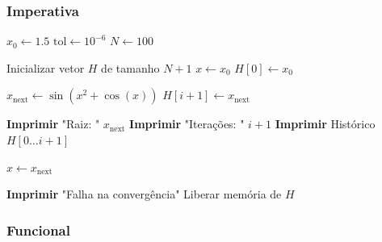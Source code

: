 \subsubsection{Imperativa}

\begin{algorithm}[H]
    \caption{Método do Ponto Fixo Iterativo}
    \label{alg:pontofixo_imperativo}
    \begin{algorithmic}[1]
            \State $x_0 \gets 1.5$ 
            \State $\text{tol} \gets 10^{-6}$ 
            \State $N \gets 100$ 
            
            \State Inicializar vetor $H$ de tamanho $N+1$ 
            \State $x \gets x_0$
            \State $H[0] \gets x_0$
            
                \State $x_{\text{next}} \gets \sin(x^2 + \cos(x))$ 
                \State $H[i+1] \gets x_{\text{next}}$ 
                
                    \State \textbf{Imprimir} "Raiz: " $x_{\text{next}}$
                    \State \textbf{Imprimir} "Iterações: " $i+1$
                    \State \textbf{Imprimir} Histórico $H[0 \dots i+1]$
                    \State {} 
                \EndIf
                
                \State $x \gets x_{\text{next}}$ 
            \EndFor
            
            \State \textbf{Imprimir} "Falha na convergência"
            \State Liberar memória de $H$
            \State {}
        \EndProcedure
    \end{algorithmic}
\end{algorithm}

\subsubsection{Funcional}

